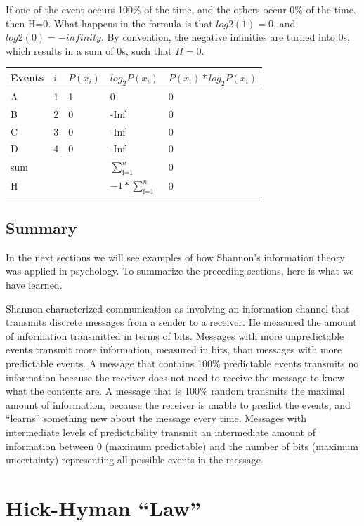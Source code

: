 \documentclass[
  oneside,
  12pt]{crumpbook}
\begin{document}
If one of the event occurs 100\% of the time, and the others occur 0\% of the time, then H=0. What happens in the formula is that \(log2(1) = 0\), and \(log2(0)= -infinity\). By convention, the negative infinities are turned into 0s, which results in a sum of 0s, such that \(H=0\).

\begin{tabular}{l|l|l|l|l}
\hline
Events & $i$ & $P(x_i)$ & $log_2 P(x_i)$ & $P(x_i)*log_2 P(x_i)$\\
\hline
A & 1 & 1 & 0 & 0\\
\hline
B & 2 & 0 & -Inf & 0\\
\hline
C & 3 & 0 & -Inf & 0\\
\hline
D & 4 & 0 & -Inf & 0\\
\hline
sum &  &  & $\sum_\text{i=1}^n$ & 0\\
\hline
H &  &  & $-1*\sum_\text{i=1}^n$ & 0\\
\hline
\end{tabular}

\hypertarget{summary}{%
\subsection{Summary}\label{summary}}

In the next sections we will see examples of how Shannon's information theory was applied in psychology. To summarize the preceding sections, here is what we have learned.

Shannon characterized communication as involving an information channel that transmits discrete messages from a sender to a receiver. He measured the amount of information transmitted in terms of bits. Messages with more unpredictable events transmit more information, measured in bits, than messages with more predictable events. A message that contains 100\% predictable events transmits no information because the receiver does not need to receive the message to know what the contents are. A message that is 100\% random transmits the maximal amount of information, because the receiver is unable to predict the events, and ``learns'' something new about the message every time. Messages with intermediate levels of predictability transmit an intermediate amount of information between 0 (maximum predictable) and the number of bits (maximum uncertainty) representing all possible events in the message.

\hypertarget{hick-hyman-law}{%
\section{Hick-Hyman ``Law''}\label{hick-hyman-law}}
\end{document}
